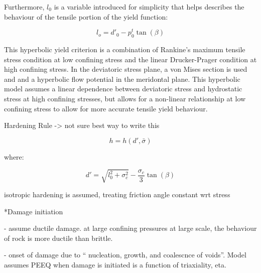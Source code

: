 Furthermore, $l_0$ is a variable introduced for simplicity that helps describes the behaviour of the tensile portion of the yield function: 

\begin{equation}
l_{o}=d'_{0}-p_{0}^{t}\tan\left(\beta\right)\label{eqn:druc2-1}
\end{equation}

This hyperbolic yield criterion is a combination of Rankine's maximum tensile stress condition at low confining stress and the linear Drucker-Prager condition at high confining stress. In the deviatoric stress plane, a von Mises section is used and and a hyperbolic flow potential in the meridontal plane. This hyperbolic model assumes a linear dependence between deviatoric stress and hydrostatic stress at high confining stresses, but allows for a non-linear relationship at low confining stress to allow for more accurate tensile yield behaviour.







Hardening Rule -> not sure best way to write this

\begin{equation}
h=h\left(d',\bar{\sigma}\right)\label{eqn:druc6}
\end{equation}


where:

\begin{equation}
d'=\sqrt{l_{0}^{2}+\sigma_{c}^{2}}-\frac{\sigma_{c}}{3}\tan\left(\beta\right)\label{eqn:druc6-1}
\end{equation}


isotropic hardening is assumed, treating friction angle constant wrt
stress

{*}Damage initiation

- assume ductile damage. at large confining pressures at large scale,
the behaviour of rock is more ductile than brittle.

- onset of damage due to `` nucleation, growth, and coalescnce of
voids''. Model assumes PEEQ when damage is initiated is a function
of triaxiality, eta.

